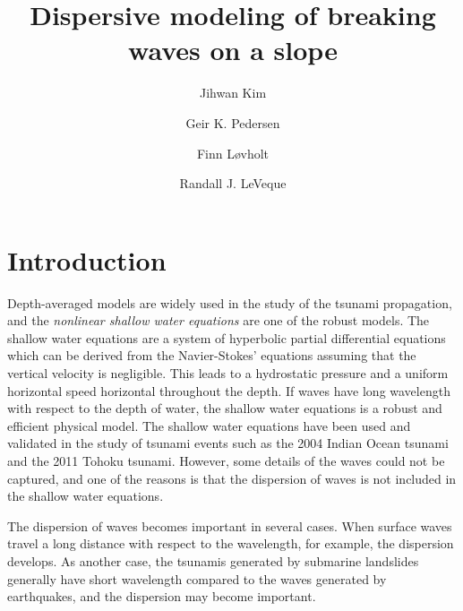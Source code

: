 \documentclass[review]{elsarticle}
\begin{document}
\begin{frontmatter}

\title{Dispersive modeling of breaking waves  on a slope}

\author[1]{Jihwan Kim}
\author[1]{Geir K. Pedersen}
\author[1,2]{Finn L{\o}vholt}
\author[3]{Randall J. LeVeque}

\address[1]{University of Oslo, Department of Mathematics, 
Oslo, Norway}
\address[2]{Norwegian Geotechnical Institute,
Oslo, Norway}
\address[3]{University of Washington, Department of Applied Mathematics, Seattle, USA}

\begin{abstract}

\end{abstract}

\begin{keyword}

\end{keyword}

\end{frontmatter}

\linenumbers

\section{Introduction}

Depth-averaged models are widely used 
in the study of the tsunami propagation,
and the {\em nonlinear shallow water equations}
are one of the robust models.
The shallow water equations
are a system of hyperbolic partial differential equations
which can be derived from 
the Navier-Stokes' equations
assuming that the vertical velocity is negligible. 
This leads 
to a hydrostatic pressure and a uniform horizontal speed horizontal throughout the depth. 
If waves have long wavelength  
with respect to the depth of water,
the shallow water equations is
a robust and efficient physical model. 
The shallow water equations have been used and validated
in the study of tsunami events 
such as the 2004 Indian Ocean tsunami and the 2011 Tohoku tsunami.
However, some details of the waves could not be captured,
and one of the reasons is that
the dispersion of waves is not included 
in the shallow water equations.

The dispersion of waves becomes important in several cases.
When surface waves travel a long distance 
with respect to the wavelength, for example,
the dispersion develops. 
As another case, the tsunamis generated by submarine landslides
generally have short wavelength compared to 
the waves generated by earthquakes,
and the dispersion may become important. 
\end{document}
